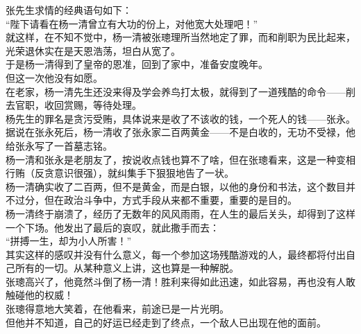 \begin{multicols}{\theparacolNo}
张先生求情的经典语句如下：\\

“陛下请看在杨一清曾立有大功的份上，对他宽大处理吧！”\\

就这样，在不知不觉中，杨一清被张璁理所当然地定了罪，而和削职为民比起来，光荣退休实在是天恩浩荡，坦白从宽了。\\

于是杨一清得到了皇帝的恩准，回到了家中，准备安度晚年。\\

但这一次他没有如愿。\\

在老家，杨一清先生还没来得及学会养鸟打太极，就得到了一道残酷的命令——削去官职，收回赏赐，等待处理。\\

杨先生的罪名是贪污受贿，具体说来是收了不该收的钱，一个死人的钱——张永。\\

据说在张永死后，杨一清收了张永家二百两黄金——不是白收的，无功不受禄，他给张永写了一首墓志铭。\\

杨一清和张永是老朋友了，按说收点钱也算不了啥，但在张璁看来，这是一种变相行贿（反贪意识很强），就纠集手下狠狠地告了一状。\\

杨一清确实收了二百两，但不是黄金，而是白银，以他的身份和书法，这个数目并不过分，但在政治斗争中，方式手段从来都不重要，重要的是目的。\\

杨一清终于崩溃了，经历了无数年的风风雨雨，在人生的最后关头，却得到了这样一个下场。他发出了最后的哀叹，就此撒手而去：\\

“拼搏一生，却为小人所害！”\\

其实这样的感叹并没有什么意义，每一个参加这场残酷游戏的人，最终都将付出自己所有的一切。从某种意义上讲，这也算是一种解脱。\\

张璁高兴了，他竟然斗倒了杨一清！胜利来得如此迅速，如此容易，再也没有人敢触碰他的权威！\\

张璁得意地大笑着，在他看来，前途已是一片光明。\\

但他并不知道，自己的好运已经走到了终点，一个敌人已出现在他的面前。\\
\ifnum{}
	\end{multicols}
\fi
\newpage
